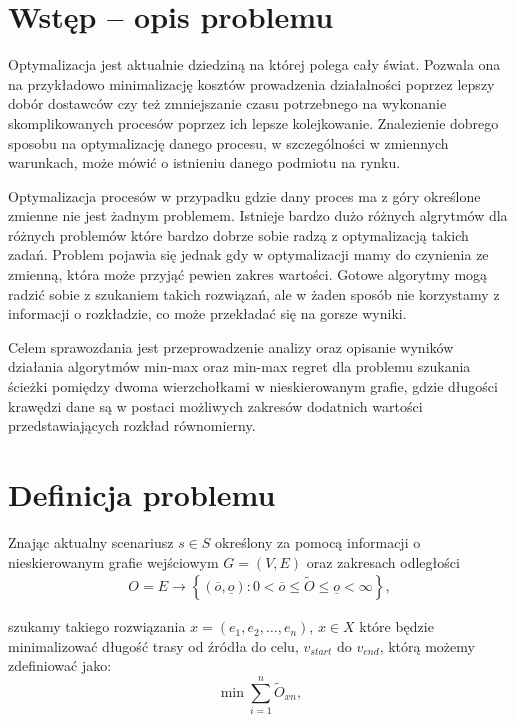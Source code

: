\documentclass[10pt]{article}
\begin{document}
\section{Wstęp -- opis problemu}
\label{sec:wstep}
Optymalizacja jest aktualnie dziedziną na której polega cały świat. Pozwala ona na przykładowo minimalizację kosztów prowadzenia działalności poprzez lepszy dobór dostawców czy też zmniejszanie czasu potrzebnego na wykonanie skomplikowanych procesów poprzez ich lepsze kolejkowanie. Znalezienie dobrego sposobu na optymalizację danego procesu, w szczególności w zmiennych warunkach, może mówić o istnieniu danego podmiotu na rynku.

Optymalizacja procesów w przypadku gdzie dany proces ma z góry określone zmienne nie jest żadnym problemem. Istnieje bardzo dużo różnych algrytmów dla różnych problemów które bardzo dobrze sobie radzą z optymalizacją takich zadań. Problem pojawia się jednak gdy w optymalizacji mamy do czynienia ze zmienną, która może przyjąć pewien zakres wartości. Gotowe algorytmy mogą radzić sobie z szukaniem takich rozwiązań, ale w żaden sposób nie korzystamy z informacji o rozkładzie, co może przekładać się na gorsze wyniki.

Celem sprawozdania jest przeprowadzenie analizy oraz opisanie wyników działania algorytmów min-max oraz min-max regret dla problemu szukania ścieżki pomiędzy dwoma wierzchołkami w nieskierowanym grafie, gdzie długości krawędzi dane są w postaci możliwych zakresów dodatnich wartości przedstawiających rozkład równomierny.

\section{Definicja problemu}
Znając aktualny scenariusz $s \in S$ określony za pomocą informacji o nieskierowanym grafie wejściowym $G = (V, E)$ oraz zakresach odległości
\begin{eqnarray*}
  O = E \rightarrow \left\{(\overline o, \underline o): 0 < \overline o \leq \widetilde O \leq \underline o < \infty\right\},
\end{eqnarray*}

szukamy takiego rozwiązania $x = \left(e_1, e_2, \dots, e_n\right)$, $x \in X$ które będzie minimalizować długość trasy od źródła do celu, $v_{start}$ do $v_{end}$, którą możemy zdefiniować jako:
\begin{equation}
  \min \sum_{i=1}^{n} \widetilde O_{xn},
\end{equation}
\end{document}
